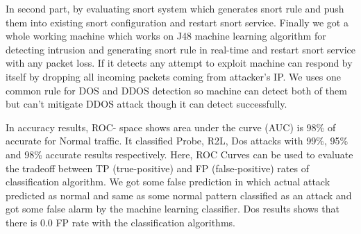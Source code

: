 
In second part, by evaluating snort system which generates snort rule and push them into existing snort configuration and restart snort service. Finally we got a whole working machine which works on J48 machine learning algorithm for detecting intrusion and generating snort rule in real-time and restart snort service with any packet loss. If it detects any attempt to exploit machine can respond by itself by dropping all incoming packets coming from attacker's IP. We uses one common rule for DOS and DDOS detection so machine can detect both of them but can't mitigate DDOS attack though it can detect successfully.

In accuracy results, ROC- space shows area under the curve (AUC) is 98\% of accurate for Normal traffic. It classified Probe, R2L, Dos attacks with 99\%, 95\% and 98\% accurate results respectively. Here, ROC Curves can be used to evaluate the tradeoff between TP (true-positive) and FP (false-positive) rates of classification algorithm. We got some false prediction in which actual attack predicted as normal and same as some normal pattern classified as an attack and got some false alarm by the machine learning classifier. Dos results shows that there is 0.0 FP rate with the classification algorithms.
